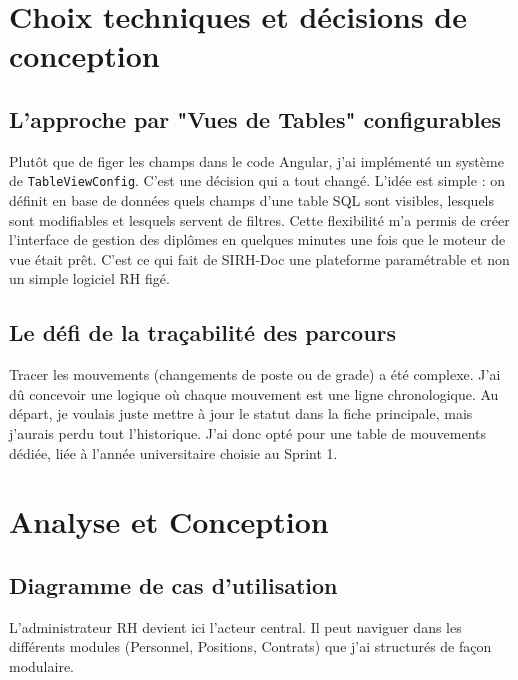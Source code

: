 \section{Choix techniques et décisions de conception}

\subsection{L'approche par "Vues de Tables" configurables}

Plutôt que de figer les champs dans le code Angular, j'ai implémenté un système de \texttt{TableViewConfig}. C'est une décision qui a tout changé. L'idée est simple : on définit en base de données quels champs d'une table SQL sont visibles, lesquels sont modifiables et lesquels servent de filtres.
Cette flexibilité m'a permis de créer l'interface de gestion des diplômes en quelques minutes une fois que le moteur de vue était prêt. C'est ce qui fait de SIRH-Doc une plateforme paramétrable et non un simple logiciel RH figé.

\subsection{Le défi de la traçabilité des parcours}

Tracer les mouvements (changements de poste ou de grade) a été complexe. J'ai dû concevoir une logique où chaque \og mouvement \fg{} est une ligne chronologique. Au départ, je voulais juste mettre à jour le statut dans la fiche principale, mais j'aurais perdu tout l'historique. J'ai donc opté pour une table de mouvements dédiée, liée à l'année universitaire choisie au Sprint 1.

\section{Analyse et Conception}

\subsection{Diagramme de cas d'utilisation}

L'administrateur RH devient ici l'acteur central. Il peut naviguer dans les différents modules (Personnel, Positions, Contrats) que j'ai structurés de façon modulaire.


